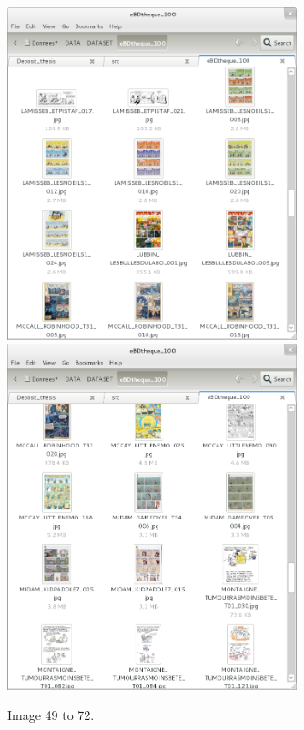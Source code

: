   \begin{figure}[h!]  %
    \centering
    
    \includegraphics[trim= 5px 10px 30px 152px, clip, width=0.75\textwidth]{thumb_05.png}
    \\
    \includegraphics[trim= 5px 3px 30px 152px, clip, width=0.75\textwidth]{thumb_07.png}
    \caption{Image 49 to 72.}
    \label{fig:app:5_6}
  \end{figure}

